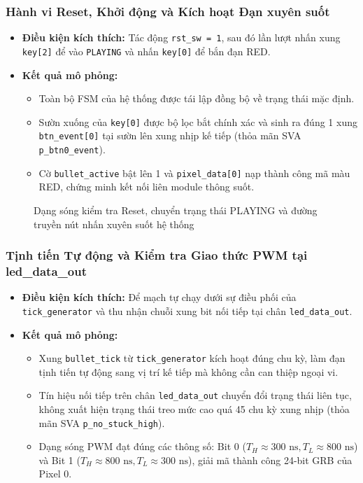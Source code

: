 \documentclass[12pt,a4paper]{article}
\begin{document}
\subsubsection{Hành vi Reset, Khởi động và Kích hoạt Đạn xuyên suốt}
\begin{itemize}
    \item \textbf{Điều kiện kích thích:} Tác động \texttt{rst\_sw = 1}, sau đó lần lượt nhấn xung \texttt{key[2]} để vào \texttt{PLAYING} và nhấn \texttt{key[0]} để bắn đạn RED.
    \item \textbf{Kết quả mô phỏng:}
    \begin{itemize}
        \item Toàn bộ FSM của hệ thống được tái lập đồng bộ về trạng thái mặc định.
        \item Sườn xuống của \texttt{key[0]} được bộ lọc bắt chính xác và sinh ra đúng 1 xung \texttt{btn\_event[0]} tại sườn lên xung nhịp kế tiếp (thỏa mãn SVA \texttt{p\_btn0\_event}).
        \item Cờ \texttt{bullet\_active} bật lên 1 và \texttt{pixel\_data[0]} nạp thành công mã màu RED, chứng minh kết nối liên module thông suốt.
    \end{itemize}
\end{itemize}

\begin{figure}[H]
    \centering
    \caption{Dạng sóng kiểm tra Reset, chuyển trạng thái PLAYING và đường truyền nút nhấn xuyên suốt hệ thống}
    \label{fig:top_reset_fire}
\end{figure}

\subsubsection{Tịnh tiến Tự động và Kiểm tra Giao thức PWM tại led\_data\_out}
\begin{itemize}
    \item \textbf{Điều kiện kích thích:} Để mạch tự chạy dưới sự điều phối của \texttt{tick\_generator} và thu nhận chuỗi xung bit nối tiếp tại chân \texttt{led\_data\_out}.
    \item \textbf{Kết quả mô phỏng:}
    \begin{itemize}
        \item Xung \texttt{bullet\_tick} từ \texttt{tick\_generator} kích hoạt đúng chu kỳ, làm đạn tịnh tiến tự động sang vị trí kế tiếp mà không cần can thiệp ngoại vi.
        \item Tín hiệu nối tiếp trên chân \texttt{led\_data\_out} chuyển đổi trạng thái liên tục, không xuất hiện trạng thái treo mức cao quá 45 chu kỳ xung nhịp (thỏa mãn SVA \texttt{p\_no\_stuck\_high}).
        \item Dạng sóng PWM đạt đúng các thông số: Bit 0 ($T_H \approx 300\text{ ns}, T_L \approx 800\text{ ns}$) và Bit 1 ($T_H \approx 800\text{ ns}, T_L \approx 300\text{ ns}$), giải mã thành công 24-bit GRB của Pixel 0.
    \end{itemize}
\end{itemize}
\end{document}
